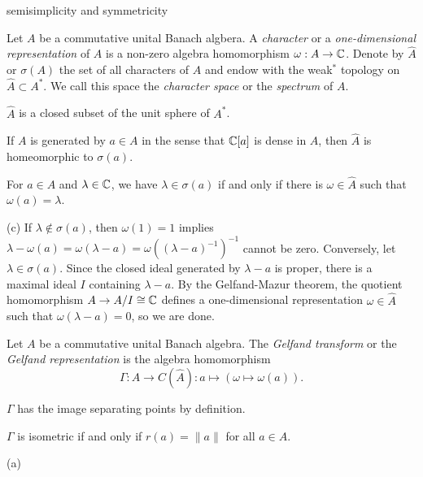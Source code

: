 \documentclass{../../large}
\begin{document}
semisimplicity and symmetricity

\begin{prb}
Let $A$ be a commutative unital Banach algbera.
A \emph{character} or a \emph{one-dimensional representation} of $A$ is a non-zero algebra homomorphism $\omega:A\to\mathbb{C}$.
Denote by $\hat A$ or $\sigma(A)$ the set of all characters of $A$ and endow with the weak$^*$ topology on $\hat A\subset A^*$.
We call this space the \emph{character space} or the \emph{spectrum} of $A$.
\begin{parts}
\item $\hat A$ is a closed subset of the unit sphere of $A^*$.
\item If $A$ is generated by $a\in A$ in the sense that $\mathbb{C}[a]$ is dense in $A$, then $\hat A$ is homeomorphic to $\sigma(a)$.
\item For $a\in A$ and $\lambda\in\mathbb{C}$, we have $\lambda\in\sigma(a)$ if and only if there is $\omega\in\hat A$ such that $\omega(a)=\lambda$.
\end{parts}
\end{prb}
\begin{pf}

(c)
If $\lambda\notin\sigma(a)$, then $\omega(1)=1$ implies $\lambda-\omega(a)=\omega(\lambda-a)=\omega((\lambda-a)^{-1})^{-1}$ cannot be zero.
Conversely, let $\lambda\in\sigma(a)$.
Since the closed ideal generated by $\lambda-a$ is proper, there is a maximal ideal $I$ containing $\lambda-a$.
By the Gelfand-Mazur theorem, the quotient homomorphism $A\to A/I\cong\mathbb{C}$ defines a one-dimensional representation $\omega\in\hat A$ such that $\omega(\lambda-a)=0$, so we are done.
\end{pf}


\begin{prb}
Let $A$ be a commutative unital Banach algebra.
The \emph{Gelfand transform} or the \emph{Gelfand representation} is the algebra homomorphism
\[\Gamma:A\to C(\hat A):a\mapsto(\omega\mapsto\omega(a)).\]
\begin{parts}
\item $\Gamma$ has the image separating points by definition.
\item $\Gamma$ is isometric if and only if $r(a)=\|a\|$ for all $a\in A$.
\end{parts}
\end{prb}
\begin{pf}
(a)

\end{pf}
\end{document}
